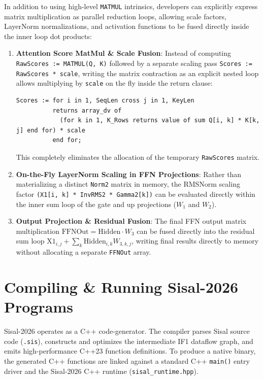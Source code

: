 \begin{note}
In addition to using high-level \texttt{MATMUL} intrinsics, developers can explicitly express matrix multiplication as parallel reduction loops, allowing scale factors, LayerNorm normalizations, and activation functions to be fused directly inside the inner loop dot products:

\begin{enumerate}
    \item \textbf{Attention Score MatMul \& Scale Fusion}: Instead of computing \texttt{RawScores := MATMUL(Q, K)} followed by a separate scaling pass \texttt{Scores := RawScores * scale}, writing the matrix contraction as an explicit nested loop allows multiplying by \texttt{scale} on the fly inside the return clause:
    \begin{lstlisting}[language=Sisal]
Scores := for i in 1, SeqLen cross j in 1, KeyLen
          returns array_dv of
            (for k in 1, K_Rows returns value of sum Q[i, k] * K[k, j] end for) * scale
          end for;
    \end{lstlisting}
    This completely eliminates the allocation of the temporary \texttt{RawScores} matrix.
    
    \item \textbf{On-the-Fly LayerNorm Scaling in FFN Projections}: Rather than materializing a distinct \texttt{Norm2} matrix in memory, the RMSNorm scaling factor \texttt{(X1[i, k] * InvRMS2 * Gamma2[k])} can be evaluated directly within the inner sum loop of the gate and up projections ($W_1$ and $W_2$).
    
    \item \textbf{Output Projection \& Residual Fusion}: The final FFN output matrix multiplication $\text{FFNOut} = \text{Hidden} \cdot W_3$ can be fused directly into the residual sum loop $\text{X1}_{i, j} + \sum_k \text{Hidden}_{i, k} W_{3, k, j}$, writing final results directly to memory without allocating a separate \texttt{FFNOut} array.
\end{enumerate}
\end{note}

\section{Compiling \& Running Sisal-2026 Programs}
Sisal-2026 operates as a C++ code-generator. The compiler parses Sisal source code (\texttt{.sis}), constructs and optimizes the intermediate IF1 dataflow graph, and emits high-performance C++23 function definitions. To produce a native binary, the generated C++ functions are linked against a standard C++ \texttt{main()} entry driver and the Sisal-2026 C++ runtime (\texttt{sisal\_runtime.hpp}).

